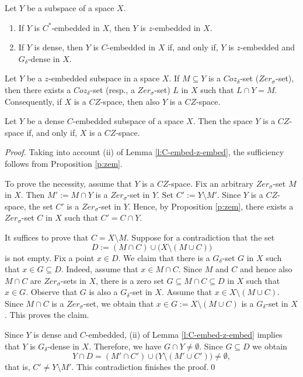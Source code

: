 \documentclass[10pt,a4paper]{amsart}
\begin{document}
\begin{lemma} \label{l:C-embed-z-embed}
Let $Y$ be a subspace of a space $X$.
\begin{enumerate}
\item[{\rm(i)}] If $Y$ is $C^\ast$-embedded in $X$, then $Y$ is $z$-embedded in $X$.
\item[{\rm(ii)}]  If $Y$ is dense, then $Y$ is $C$-embedded in $X$ if, and only if, $Y$ is $z$-embedded and $G_\delta$-dense in $X$.
\end{enumerate}
\end{lemma}

\begin{proposition}\label{p:zem}
Let $Y$ be a $z$-embedded  subspace  in a space $X$. If $M\subseteq Y$  is a $Coz_{\delta}$-set {\rm(}$Zer_{\sigma}$-set{\rm)}, then there exists a $Coz_{\delta}$-set {\rm(}resp., a $Zer_{\sigma}$-set{\rm)} $L$ in $X$ such that $L \cap Y = M$. Consequently, if $X$ is a $CZ$-space, then also $Y$ is a $CZ$-space.
\end{proposition}

\begin{proposition} \label{l:zcembed}
Let  $Y$ be a dense $C$-embedded subspace of a space $X$. Then the space $Y$ is a $CZ$-space if, and only if, $X$ is a $CZ$-space.
\end{proposition}

\begin{proof}
Taking into account (ii) of Lemma \ref{l:C-embed-z-embed}, the sufficiency follows from Proposition \ref{p:zem}.
\smallskip

To prove the necessity, assume that $Y$ is a $CZ$-space. Fix an arbitrary $Zer_{\sigma}$-set  $M$ in $X$. Then $M':=M\cap Y$ is a $Zer_{\sigma}$-set in $Y$. Set $C':=Y\setminus M'$. Since $Y$ is a $CZ$-space, the set $C'$ is a $Zer_{\sigma}$-set in $Y$. Hence, by Proposition \ref{p:zem},  there exists a $Zer_{\sigma}$-set $C$ in $X$ such that $C'=C\cap Y$.

It suffices to prove that $C=X\setminus M$. Suppose for a contradiction that the set
\[
D:=(M\cap C)\cup \big(X\setminus (M\cup C)\big)
\]
is not empty. Fix a point $x\in D$. We claim that there is a $G_\delta$-set $G$ in $X$ such that $x\in G\subseteq D$. Indeed, assume that $x\in M\cap C$. Since $M$ and $C$ and hence also $M\cap C$ are $Zer_{\sigma}$-sets in $X$, there is a zero set $G\subseteq M\cap C\subseteq D$ in $X$ such that $x\in G$. Observe that $G$ is also a $G_\delta$-set in $X$. Assume that $x\in X\setminus (M\cup C)$. Since $M\cap C$ is a  $Zer_{\sigma}$-set, we obtain that $x\in G:=X\setminus (M\cup C)$ is a $G_\delta$-set in $X$. This proves the claim.

Since $Y$ is dense and $C$-embedded, (ii) of Lemma \ref{l:C-embed-z-embed} implies that $Y$ is $G_\delta$-dense in $X$. Therefore,  we have $G\cap Y\neq\emptyset$. Since $G\subseteq D$ we obtain
\[
Y\cap D=(M'\cap C')\cup \big(Y\setminus (M'\cup C')\big)\neq\emptyset,
\]
that is, $C'\neq Y\setminus M'$. This contradiction finishes the proof.\qed
\end{proof}
\end{document}
